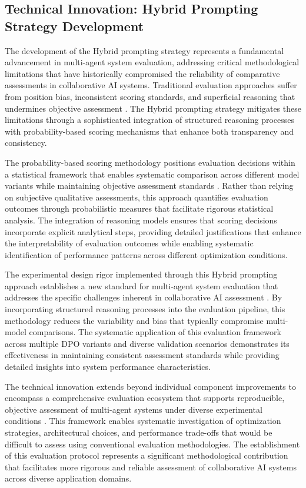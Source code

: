 \subsection{Technical Innovation: Hybrid Prompting Strategy Development}

The development of the Hybrid prompting strategy represents a fundamental advancement in multi-agent system evaluation, addressing critical methodological limitations that have historically compromised the reliability of comparative assessments in collaborative AI systems. Traditional evaluation approaches suffer from position bias, inconsistent scoring standards, and superficial reasoning that undermines objective assessment \cite{wang2025judging_bias_lrms, ye2024justice_prejudice}. The Hybrid prompting strategy mitigates these limitations through a sophisticated integration of structured reasoning processes with probability-based scoring mechanisms that enhance both transparency and consistency.

The probability-based scoring methodology positions evaluation decisions within a statistical framework that enables systematic comparison across different model variants while maintaining objective assessment standards \cite{li2023generative_judge, liu2023geval}. Rather than relying on subjective qualitative assessments, this approach quantifies evaluation outcomes through probabilistic measures that facilitate rigorous statistical analysis. The integration of reasoning models ensures that scoring decisions incorporate explicit analytical steps, providing detailed justifications that enhance the interpretability of evaluation outcomes while enabling systematic identification of performance patterns across different optimization conditions.

The experimental design rigor implemented through this Hybrid prompting approach establishes a new standard for multi-agent system evaluation that addresses the specific challenges inherent in collaborative AI assessment \cite{chan2023chateval, chen2024meta_evaluation}. By incorporating structured reasoning processes into the evaluation pipeline, this methodology reduces the variability and bias that typically compromise multi-model comparisons. The systematic application of this evaluation framework across multiple DPO variants and diverse validation scenarios demonstrates its effectiveness in maintaining consistent assessment standards while providing detailed insights into system performance characteristics.

The technical innovation extends beyond individual component improvements to encompass a comprehensive evaluation ecosystem that supports reproducible, objective assessment of multi-agent systems under diverse experimental conditions \cite{biderman2024reproducible_evaluation, siegel2024core_bench}. This framework enables systematic investigation of optimization strategies, architectural choices, and performance trade-offs that would be difficult to assess using conventional evaluation methodologies. The establishment of this evaluation protocol represents a significant methodological contribution that facilitates more rigorous and reliable assessment of collaborative AI systems across diverse application domains.

